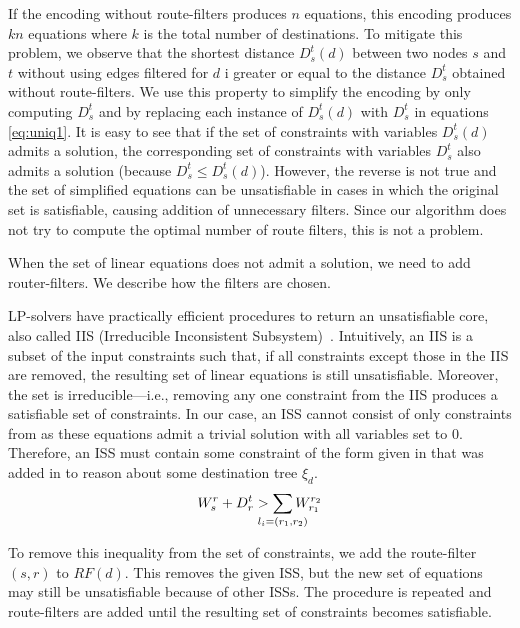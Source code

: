 If the encoding without route-filters produces $n$ equations, this
encoding produces $kn$ equations where $k$ is the total number of destinations.  
To mitigate this problem, we observe that the shortest distance $D_s^t(d)$ between two
nodes $s$ and $t$ without using edges filtered for $d$ i
greater or equal to the distance $D_s^t$ obtained without route-filters.  
We use this property to simplify the
encoding by only computing $D_s^t$ and by replacing each instance of
$D_s^t(d)$ with $D_s^t$ in equations \eqref{eq:uniq1}.  It is easy to see that 
if the set of constraints with variables $D_s^t(d)$ admits a solution,
the corresponding set of constraints with variables $D_s^t$ 
also admits a solution (because $D_s^t\leq
D_s^t(d)$).  However, the reverse is not true and the set of
simplified equations can be unsatisfiable in cases in which the
original set is satisfiable, causing addition of unnecessary filters.
Since our algorithm does not try to compute the optimal 
number of route filters, this is not a problem.


When the set of linear equations does not admit a solution, we 
need to add router-filters. We describe how the filters are chosen.

LP-solvers have practically efficient procedures to return an
unsatisfiable core, also called IIS (Irreducible Inconsistent Subsystem)~\cite{chinneck2007feasibility}. 
Intuitively, an IIS is a subset of the input constraints such that,
if all constraints except those in the IIS are removed, the resulting set of
linear equations is still unsatisfiable. Moreover, the set is irreducible---i.e., removing 
any one constraint from the IIS produces a satisfiable set of constraints. 
In our case, an ISS cannot consist of only 
constraints from  as these equations
admit a trivial solution with all variables set to 0. 
Therefore, an ISS must contain some constraint of the form
given in  
that was added in to reason about some destination tree $\xi_d$.
\[
W_s^r + D_r^t  > \sum_{\mathclap{\substack{l_i=(r_1,r_2)}}} 
		W_{r_1}^{r_2}
\]		


To remove this inequality from the set of constraints, we add the route-filter $(s,r)$ to $RF(d)$.
This removes the given ISS, but the new set of equations may still be unsatisfiable because of other ISSs. 
The procedure is repeated and route-filters are added until the resulting set of constraints becomes satisfiable.




